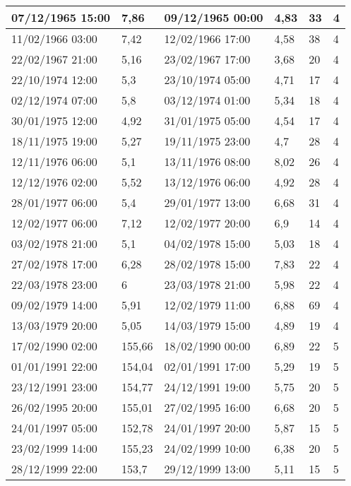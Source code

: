 \begin{longtable}{|p{3cm}|p{2.1cm}|p{3cm}|p{2cm}|l|l|}
        07/12/1965 15:00 & 7,86 & 09/12/1965 00:00 & 4,83 & 33 & 4 \\ \hline
        11/02/1966 03:00 & 7,42 & 12/02/1966 17:00 & 4,58 & 38 & 4 \\ \hline
        22/02/1967 21:00 & 5,16 & 23/02/1967 17:00 & 3,68 & 20 & 4 \\ \hline
        22/10/1974 12:00 & 5,3 & 23/10/1974 05:00 & 4,71 & 17 & 4 \\ \hline
        02/12/1974 07:00 & 5,8 & 03/12/1974 01:00 & 5,34 & 18 & 4 \\ \hline
        30/01/1975 12:00 & 4,92 & 31/01/1975 05:00 & 4,54 & 17 & 4 \\ \hline
        18/11/1975 19:00 & 5,27 & 19/11/1975 23:00 & 4,7 & 28 & 4 \\ \hline
        12/11/1976 06:00 & 5,1 & 13/11/1976 08:00 & 8,02 & 26 & 4 \\ \hline
        12/12/1976 02:00 & 5,52 & 13/12/1976 06:00 & 4,92 & 28 & 4 \\ \hline
        28/01/1977 06:00 & 5,4 & 29/01/1977 13:00 & 6,68 & 31 & 4 \\ \hline
        12/02/1977 06:00 & 7,12 & 12/02/1977 20:00 & 6,9 & 14 & 4 \\ \hline
        03/02/1978 21:00 & 5,1 & 04/02/1978 15:00 & 5,03 & 18 & 4 \\ \hline
        27/02/1978 17:00 & 6,28 & 28/02/1978 15:00 & 7,83 & 22 & 4 \\ \hline
        22/03/1978 23:00 & 6 & 23/03/1978 21:00 & 5,98 & 22 & 4 \\ \hline
        09/02/1979 14:00 & 5,91 & 12/02/1979 11:00 & 6,88 & 69 & 4 \\ \hline
        13/03/1979 20:00 & 5,05 & 14/03/1979 15:00 & 4,89 & 19 & 4 \\ \hline
        17/02/1990 02:00 & 155,66 & 18/02/1990 00:00 & 6,89 & 22 & 5 \\ \hline
        01/01/1991 22:00 & 154,04 & 02/01/1991 17:00 & 5,29 & 19 & 5 \\ \hline
        23/12/1991 23:00 & 154,77 & 24/12/1991 19:00 & 5,75 & 20 & 5 \\ \hline
        26/02/1995 20:00 & 155,01 & 27/02/1995 16:00 & 6,68 & 20 & 5 \\ \hline
        24/01/1997 05:00 & 152,78 & 24/01/1997 20:00 & 5,87 & 15 & 5 \\ \hline
        23/02/1999 14:00 & 155,23 & 24/02/1999 10:00 & 6,38 & 20 & 5 \\ \hline
        28/12/1999 22:00 & 153,7 & 29/12/1999 13:00 & 5,11 & 15 & 5 \\ \hline

\end{longtable}
